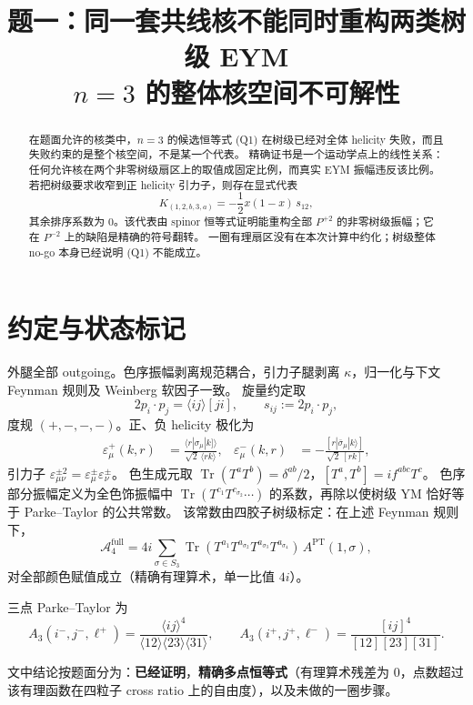 \documentclass[11pt]{ctexart}
\title{题一：同一套共线核不能同时重构两类树级 EYM\\
\large $n=3$ 的整体核空间不可解性}
\author{}
\date{}
\numberwithin{equation}{section}
\theoremstyle{definition}
\theoremstyle{remark}
\newcommand{\ang}[1]{\langle #1\rangle}
\newcommand{\sq}[1]{[#1]}
\begin{document}
\maketitle

\begin{abstract}
在题面允许的核类中，$n=3$ 的候选恒等式 (Q1) 在树级已经对全体 helicity 失败，而且失败约束的是整个核空间，不是某一个代表。
精确证书是一个运动学点上的线性关系：任何允许核在两个非零树级扇区上的取值成固定比例，而真实 EYM 振幅违反该比例。
若把树级要求收窄到正 helicity 引力子，则存在显式代表
\[
K_{(1,2,b,3,a)}=-\frac12 x(1-x)\,s_{12},
\]
其余排序系数为 $0$。该代表由 spinor 恒等式证明能重构全部 $P^{+2}$ 的非零树级振幅；它在 $P^{-2}$ 上的缺陷是精确的符号翻转。
一圈有理扇区没有在本次计算中约化；树级整体 no-go 本身已经说明 (Q1) 不能成立。
\end{abstract}

\section{约定与状态标记}
外腿全部 outgoing。色序振幅剥离规范耦合，引力子腿剥离 $\kappa$，归一化与下文 Feynman 规则及 Weinberg 软因子一致。
旋量约定取
\[
2p_i\cdot p_j=\ang{ij}\sq{ji},\qquad
s_{ij}:=2p_i\cdot p_j,
\]
度规 $(+,-,-,-)$。正、负 helicity 极化为
\begin{align*}
\varepsilon^+_\mu(k,r)&=\frac{\ang{r|\sigma_\mu|k]}}{\sqrt2\,\ang{rk}},&
\varepsilon^-_\mu(k,r)&=-\frac{\sq{r|\bar\sigma_\mu|k\rangle}}{\sqrt2\,\sq{rk}},
\end{align*}
引力子 $\varepsilon^{\pm2}_{\mu\nu}=\varepsilon^\pm_\mu\varepsilon^\pm_\nu$。
色生成元取 $\operatorname{Tr}(T^aT^b)=\delta^{ab}/2$，$[T^a,T^b]=if^{abc}T^c$。
色序部分振幅定义为全色饰振幅中 $\operatorname{Tr}(T^{c_1}T^{c_{\sigma_2}}\cdots)$ 的系数，再除以使树级 YM 恰好等于 Parke--Taylor 的公共常数。
该常数由四胶子树级标定：在上述 Feynman 规则下，
\[
\mathcal A_4^{\mathrm{full}}
=4i\sum_{\sigma\in S_3}\operatorname{Tr}(T^{a_1}T^{a_{\sigma_2}}T^{a_{\sigma_3}}T^{a_{\sigma_4}})
\,A^{\mathrm{PT}}(1,\sigma),
\]
对全部颜色赋值成立（精确有理算术，单一比值 $4i$）。

三点 Parke--Taylor 为
\[
A_3(i^-,j^-,\ell^+)
=\frac{\ang{ij}^4}{\ang{12}\ang{23}\ang{31}},
\qquad
A_3(i^+,j^+,\ell^-)
=\frac{\sq{ij}^4}{\sq{12}\sq{23}\sq{31}}.
\]

文中结论按题面分为：\textbf{已经证明}，\textbf{精确多点恒等式}（有理算术残差为 $0$，点数超过该有理函数在四粒子 cross ratio 上的自由度），以及未做的一圈步骤。
\end{document}
